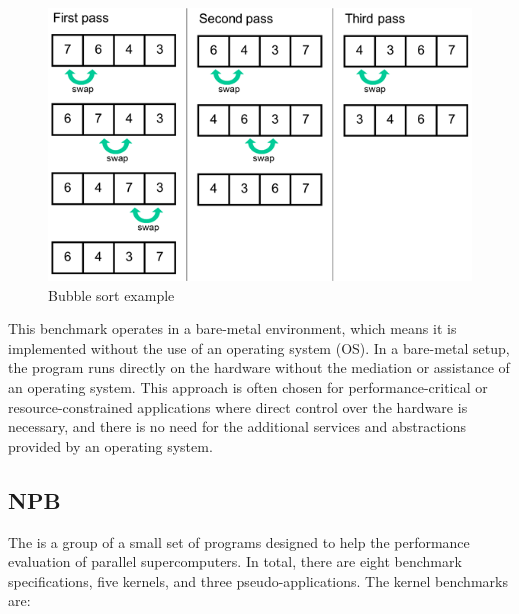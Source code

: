 \begin{figure}[H]
	\centering
 	\includegraphics[width=0.7\linewidth]{Images/bubble_sort.png}
 	\caption{Bubble sort example}
	 \label{fig_bubble_sort}
\end{figure}

This benchmark operates in a bare-metal environment, which means it is implemented without the use of an operating system (OS). In a bare-metal 
setup, the program runs directly on the hardware without the mediation or assistance of an operating system. This approach is often chosen for 
performance-critical or resource-constrained applications where direct control over the hardware is necessary, and there is no need for the 
additional services and abstractions provided by an operating system.

\subsection{NPB}

The  \cite{bailey1994parallel} is a group of a small set of programs designed to help the performance evaluation of parallel 
supercomputers. In total, there are eight benchmark specifications, five kernels, and three pseudo-applications. The kernel benchmarks are:

